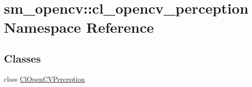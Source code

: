 \hypertarget{namespacesm__opencv_1_1cl__opencv__perception}{}\section{sm\+\_\+opencv\+:\+:cl\+\_\+opencv\+\_\+perception Namespace Reference}
\label{namespacesm__opencv_1_1cl__opencv__perception}
\subsection*{Classes}
\begin{DoxyCompactItemize}
\item 
class \hyperlink{classsm__opencv_1_1cl__opencv__perception_1_1ClOpenCVPerception}{Cl\+Open\+C\+V\+Perception}
\end{DoxyCompactItemize}

